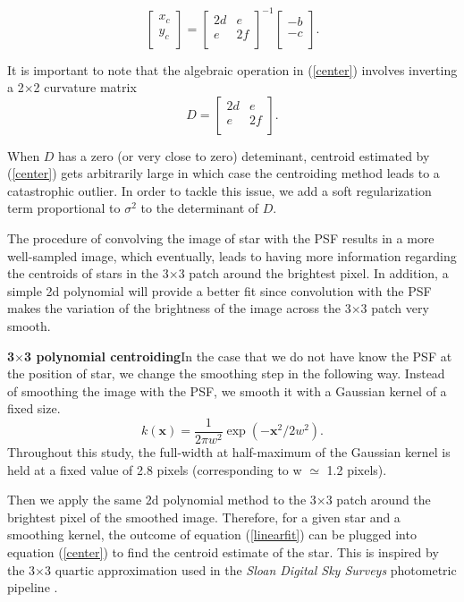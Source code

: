 \documentclass[12pt, preprint]{aastex}
\newcommand{\beq}{\begin{equation}}
\newcommand{\eeq}{\end{equation}}
\begin{document}
\beq
  \begin{bmatrix}
      x_{c}\\
      y_{c}\\
  \end{bmatrix} = 
  \begin{bmatrix}
      2d & e\\
      e & 2f\\
  \end{bmatrix}^{-1}
  \begin{bmatrix}
      -b\\
      -c\\
  \end{bmatrix}.
\label{center}
\eeq

It is important to note that the algebraic operation in (\ref{center}) involves 
inverting a 2$\times$2 curvature matrix
\beq
  D = 
  \begin{bmatrix}
      2d & e\\
      e & 2f\\
  \end{bmatrix}.
\eeq

When $D$ has a zero (or very close to zero) deteminant,
centroid estimated by (\ref{center}) gets arbitrarily 
large in which case the centroiding method leads to a catastrophic 
outlier. In order to tackle this issue, we add a soft regularization term
proportional to $\sigma^{2}$ to the determinant of $D$.

The procedure of convolving the image of star with the PSF results in a
more well-sampled image, which eventually, leads to having more
information regarding the centroids of stars in the 3$\times$3 patch around the
brightest pixel. In addition, a simple 2d polynomial will provide a better fit 
since convolution with the PSF makes the variation of the brightness of the image
 across the 3$\times$3 patch very smooth.
 
\item{\bf 3$\times$3 polynomial centroiding}\quad In the case that 
we do not have know the PSF at the position of star, we change 
the smoothing step in the following way. Instead of smoothing the image 
with the PSF, we smooth it with a Gaussian kernel of a fixed size. 
\beq
k(\mathbf{x}) = \frac{1}{2\pi w^2}\exp(-\mathbf{x}^{2}/2w^{2}).
\eeq
Throughout this study, the full-width at half-maximum of the Gaussian kernel is held at
a fixed value of 2.8 pixels (corresponding to w $\simeq$ 1.2 pixels).

Then we apply the same 2d polynomial method to the 3$\times$3 patch around the brightest
pixel of the smoothed image. Therefore, for a given star and a smoothing kernel,
the outcome of equation (\ref{linearfit}) can be
plugged into equation (\ref{center}) to find the centroid estimate
of the star. This is inspired by the 3$\times$3 quartic approximation 
used in the \textsl{Sloan Digital Sky Surveys} photometric pipeline \citep{sdss}.
\end{document}
